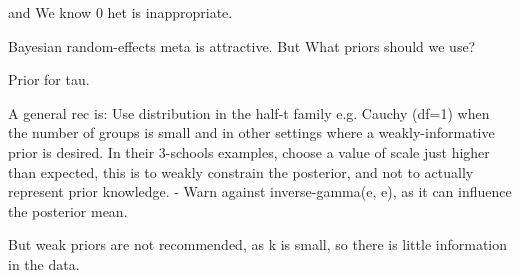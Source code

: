 and We know 0 het is inappropriate.

Bayesian random-effects meta is attractive.
But What priors should we use?

Prior for tau.

A general rec is:
Use distribution in the half-t family e.g. Cauchy (df=1) when the number of groups is small and in other settings where a weakly-informative prior is desired.
In their 3-schools examples, choose a value of scale just higher than expected, this is to weakly constrain the posterior, and not to actually represent prior knowledge.
- Warn against inverse-gamma(e, e), as it can influence the posterior mean.

But weak priors are not recommended, as k is small, so there is little information in the data.

